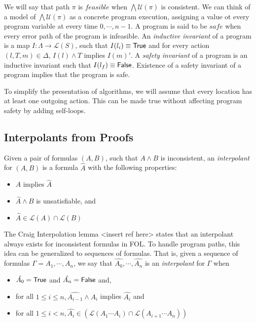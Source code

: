 We will say that path $\pi$ is $feasible$ when $\bigwedge \mathcal{U}(\pi)$ is consistent. We can think of a model of $\bigwedge \mathcal{U}(\pi)$ as a concrete program execution, assigning a value ot every program variable at every time $0, \cdots, n-1$. A program is said to be $safe$ when every error path of the program is infeasible. An \textit{inductive invariant} of a program is a map $I : \Lambda \rightarrow \mathcal{L}(S)$, such that $I(l_i) \equiv \mathsf{True}$ and for every action $(l, T, m) \in \Delta$, $I(l) \wedge T$ implies $I(m)'$. A \textit{safety invariant} of a program is an inductive invariant such that $I(l_f) \equiv \mathsf{False}$. Existence of a safety invariant of a program implies that the program is safe.

To simplify the presentation of algorithms, we will assume that every location has at least one outgoing action. This can be made true without affecting program safety by adding self-loops.

\subsection{Interpolants from Proofs}

Given a pair of formulas $(A,B)$, such that $A \wedge B$ is inconsistent, an \textit{interpolant} for $(A,B)$ is a formula $\hat{A}$ with the following properties:

\begin{itemize}
  \item $A$ implies $\hat{A}$
  \item $\hat{A} \wedge B$ is unsatisfiable, and
  \item $\hat{A} \in \mathcal{L}(A) \cap \mathcal{L}(B)$
\end{itemize}

The Craig Interpolation lemma <insert ref here> states that an interpolant always exists for inconsistent formulas in FOL. To handle program paths, this idea can be generalized to sequences of formulas. That is, given a sequence of formulas $\Gamma = A_1, \cdots , A_n$, we say that $\hat{A_0},\cdots, \hat{A_n}$ is an \textit{interpolant} for $\Gamma$ when

\begin{itemize}
  \item $\hat{A_0} = \mathsf{True}$ and $\hat{A_n} = \mathsf{False}$ and,
  \item for all $1 \leq i \leq n, \hat{A_{i-1}} \wedge A_i$ implies $\hat{A_i}$ and
  \item for all $1 \leq i < n, \hat{A_i} \in (\mathcal{L}(A_1 \cdots A_i) \cap \mathcal{L}(A_{i+1}\cdots A_n))$
\end{itemize}

